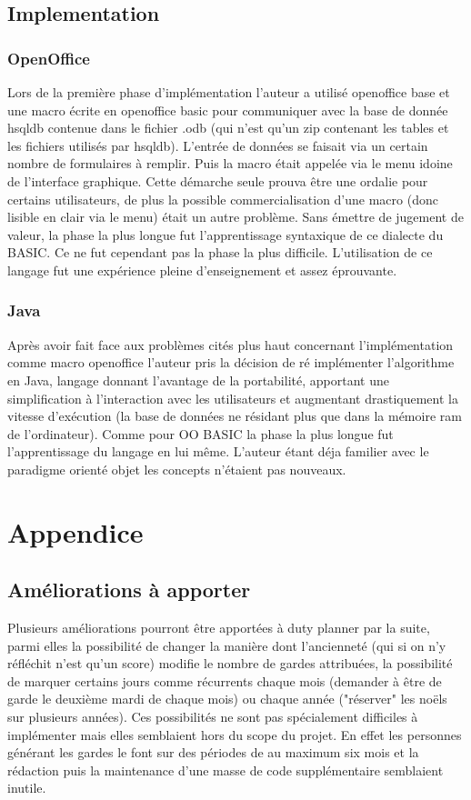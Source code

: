 \documentclass[11pt]{report}
\begin{document}
\section{Implementation}
\subsection{OpenOffice}
	Lors de la première phase d'implémentation l'auteur a utilisé openoffice base et une macro écrite en openoffice basic pour communiquer avec la base de donnée hsqldb contenue dans le fichier .odb (qui n'est qu'un zip contenant les tables et les fichiers utilisés par hsqldb).
 L'entrée de données se faisait via un certain nombre de formulaires à remplir. 
Puis la macro était appelée via le menu idoine de l'interface graphique.
Cette démarche  seule prouva être une ordalie pour certains utilisateurs, de plus la possible commercialisation d'une macro (donc lisible en clair via le menu) était un autre problème.
Sans émettre de jugement de valeur, la phase la plus longue fut l'apprentissage syntaxique de ce dialecte du BASIC.
Ce ne fut cependant pas la phase la plus difficile. L'utilisation de ce langage fut une expérience pleine d'enseignement et assez éprouvante.

\subsection{Java}

Après avoir fait face aux problèmes cités plus haut concernant l'implémentation comme macro openoffice l'auteur pris la décision de ré implémenter l'algorithme en Java, langage donnant l'avantage de la portabilité, apportant une simplification à l'interaction avec les utilisateurs et augmentant drastiquement la vitesse d'exécution (la base de données ne résidant plus que dans la mémoire ram de l'ordinateur). Comme pour OO BASIC la phase la plus longue fut l'apprentissage du langage en lui même. L'auteur étant déja familier avec le paradigme orienté objet\cite{ooparadigm} les concepts n'étaient pas nouveaux.

\chapter{Appendice}
\section{Améliorations à apporter}
Plusieurs améliorations pourront être apportées à duty planner par la suite, parmi elles la possibilité de changer la manière dont l'ancienneté (qui si on n'y réfléchit n'est qu'un score) modifie le nombre de gardes attribuées, la possibilité de marquer certains jours comme récurrents chaque mois (demander à être de garde le deuxième mardi de chaque mois) ou chaque année ("réserver" les noëls sur plusieurs années).
 Ces possibilités ne sont pas spécialement difficiles à implémenter mais elles semblaient hors du scope du projet. 
En effet les personnes générant les gardes le font sur des périodes de au maximum six mois et la rédaction puis la maintenance d'une masse de code supplémentaire semblaient inutile\cite{yagn}.
\end{document}

